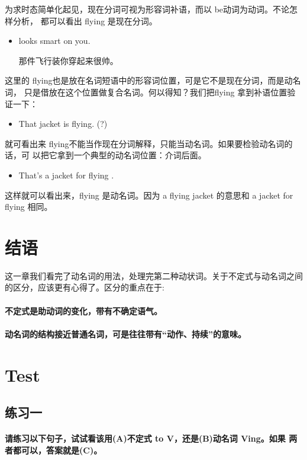为求时态简单化起见，现在分词可视为形容词补语，而以 be动词为动词。不论怎样分析，
都可以看出 flying 是现在分词。

\begin{itemize}
\item {} looks smart on you.

  那件飞行装你穿起来很帅。
\end{itemize}
这里的 flying也是放在名词短语中的形容词位置，可是它不是现在分词，而是动名词，
只是借放在这个位置做复合名词。何以得知？我们把flying 拿到补语位置验证一下：

\begin{itemize}
\item  That jacket is flying. (?)
\end{itemize}
就可看出来 flying不能当作现在分词解释，只能当动名词。如果要检验动名词的话，可
以把它拿到一个典型的动名词位置：介词后面。
\begin{itemize}
\item That's a jacket for flying .
\end{itemize}
这样就可以看出来，flying 是动名词。因为 a flying jacket 的意思和 a
jacket for flying 相同。

\section{结语}

这一章我们看完了动名词的用法，处理完第二种动状词。关于不定式与动名词之间的区分，应该更有心得了。区分的重点在于:

\paragraph{不定式是助动词的变化，带有不确定语气。}
\paragraph{动名词的结构接近普通名词，可是往往带有“动作、持续”的意味。}

\section{Test}

\subsection{练习一}

\paragraph{请练习以下句子，试试看该用(A)不定式 to V，还是(B)动名词 Ving。如果
  两者都可以，答案就是(C)。}

